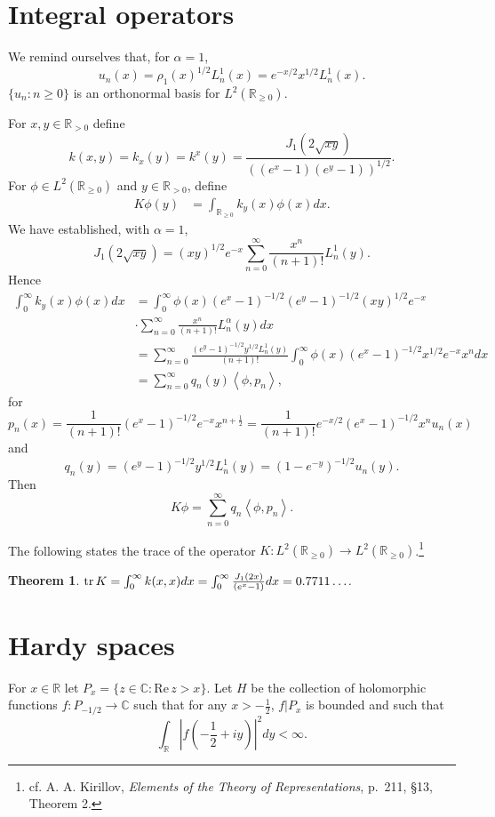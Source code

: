 \documentclass{article}
\newcommand{\inner}[2]{\left\langle #1, #2 \right\rangle}
\newcommand{\tr}{\ensuremath\mathrm{tr}\,}
\def\Re{\ensuremath{\mathrm{Re}}\,}
\newtheorem{theorem}{Theorem}
\theoremstyle{definition}
\begin{document}
\section{Integral operators}
We remind ourselves that, for $\alpha=1$,
\[
u_n(x)=\rho_1(x)^{1/2} L_n^1(x) = e^{-x/2} x^{1/2} L_n^1(x).
\]
$\{u_n: n \geq 0\}$ is an orthonormal basis for $L^2(\mathbb{R}_{\geq 0})$.


For $x,y \in \mathbb{R}_{> 0}$ define
\[
k(x,y)= k_x(y) = k^x(y) = \frac{J_1(2 \sqrt{xy})}{((e^x-1)(e^y-1))^{1/2}}.
\]
For $\phi \in L^2(\mathbb{R}_{\geq 0})$ and $y \in \mathbb{R}_{> 0}$, define
\begin{align*}
K\phi(y) &= \int_{\mathbb{R}_{\geq 0}} k_y(x) \phi(x) dx.
\end{align*}
We have established, with $\alpha=1$,
\[
J_1(2\sqrt{xy}) = (xy)^{1/2} e^{-x} \sum_{n=0}^\infty \frac{x^n}{(n+1)!} L_n^1(y).
\]
Hence
\begin{align*}
\int_0^\infty k_y(x) \phi(x) dx&=\int_0^\infty \phi(x) (e^x-1)^{-1/2} (e^y-1)^{-1/2} (xy)^{1/2}
e^{-x}\\
&\cdot \sum_{n=0}^\infty \frac{x^n}{(n+1)!} L_n^\alpha(y) dx\\
&=\sum_{n=0}^\infty \frac{(e^y-1)^{-1/2} y^{1/2} L_n^1(y)}{(n+1)!} \int_0^\infty \phi(x) (e^x-1)^{-1/2}
x^{1/2} e^{-x} x^n dx\\
&=\sum_{n=0}^\infty q_n(y)  \inner{\phi}{p_n},
\end{align*}
for
\[
p_n(x)=\frac{1}{(n+1)!} (e^x-1)^{-1/2} e^{-x} x^{n+\frac{1}{2}}
=\frac{1}{(n+1)!} e^{-x/2} (e^x-1)^{-1/2} x^n u_n(x)
\]
and
\[
q_n(y)=(e^y-1)^{-1/2} y^{1/2} L_n^1(y) = (1-e^{-y})^{-1/2} u_n(y).
\]
Then
\[
K\phi = \sum_{n=0}^\infty q_n \inner{\phi}{p_n}.
\]



The following states the trace of the operator $K:L^2(\mathbb{R}_{\geq 0}) \to L^2(\mathbb{R}_{\geq 0})$.\footnote{cf.
A. A. Kirillov, {\em Elements of the Theory of Representations},
p.~211, \S 13, Theorem 2.}



\begin{theorem}
$\tr K=\int_0^\infty k(x,x) dx=\int_0^\infty \frac{J_1(2x)}{(e^x-1)} dx=0.7711\ldots$.
\end{theorem}







\section{Hardy spaces}
For $x \in \mathbb{R}$ let $P_x=\{z \in \mathbb{C}: \Re z > x\}$.
Let $H$ be the collection of holomorphic functions $f:P_{-1/2} \to \mathbb{C}$ such that for
any $x>-\frac{1}{2}$, $f|P_x$ is bounded and such that
\[
\int_{\mathbb{R}} \left| f\left( -\frac{1}{2}+iy\right) \right|^2 dy<\infty.
\]
\end{document}
